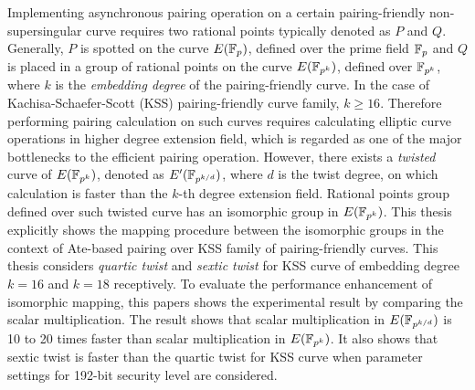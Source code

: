 


Implementing asynchronous pairing operation on  a certain pairing-friendly non-supersingular curve requires two rational points typically denoted as $P$ and $Q$. Generally, $P$ is spotted on the curve  $E(\mathbb{F}_p)$, defined over the prime field $\mathbb{F}_p$ and $Q$ is placed in a group of rational points on the curve $E(\mathbb{F}_{p^k})$, defined over $\mathbb{F}_{p^k}$, where $k$ is the \textit{embedding degree} of the pairing-friendly curve. In the case of  Kachisa-Schaefer-Scott (KSS) pairing-friendly curve family, $k \geq 16$. Therefore performing pairing calculation on such curves requires calculating elliptic curve operations in higher degree extension field, which is regarded as one of the major bottlenecks to the efficient pairing operation. However, there exists a \textit{twisted} curve of $E(\mathbb{F}_{p^k})$, denoted as  $E'(\mathbb{F}_{p^{k/d}})$, where $d$ is the twist degree, on which calculation is faster than the $k$-th degree extension field. Rational points group defined over such twisted curve has an isomorphic group in $E(\mathbb{F}_{p^k})$. This thesis explicitly shows the mapping  procedure between the isomorphic groups in the context of Ate-based pairing over KSS family of pairing-friendly curves. This thesis considers \textit{quartic twist} and \textit{sextic twist} for KSS curve of embedding degree $k =16$ and $k=18$ receptively.  To evaluate the performance enhancement of isomorphic mapping, this papers shows the experimental result by comparing the scalar multiplication. The result shows that scalar multiplication in $E(\mathbb{F}_{p^{k/d}})$ is 10 to 20  times faster than scalar multiplication in $E(\mathbb{F}_{p^k})$. It also shows that sextic twist is faster than the quartic twist for KSS curve when parameter settings for 192-bit security level are considered. 


